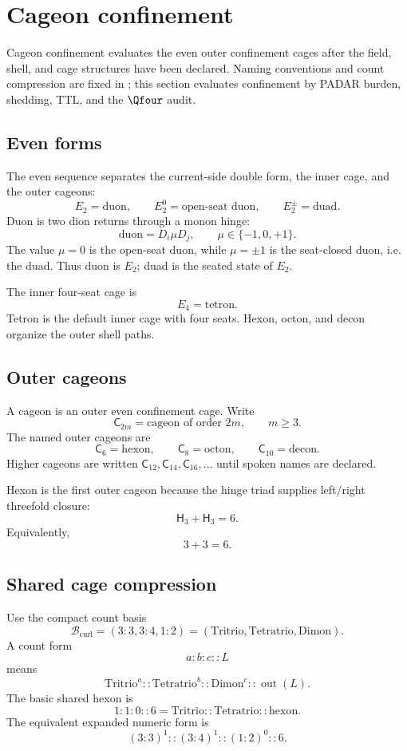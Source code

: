 \section{Cageon confinement}\label{sec:cageon-confinement}

Cageon confinement evaluates the even outer confinement cages after the field, shell, and cage structures have been declared. Naming conventions and count compression are fixed in ; this section evaluates confinement by PADAR burden, shedding, TTL, and the \(\Qfour\) audit.

\subsection{Even forms}\label{subsec:cageon-even-forms}
The even sequence separates the current-side double form, the inner cage, and the outer cageons:
\[
E_2=\mathrm{duon},
\qquad
E_2^{0}=\text{open-seat duon},
\qquad
E_2^{\pm}=\mathrm{duad}.
\]
Duon is two dion returns through a monon hinge:
\[
\mathrm{duon}=D_i\mu D_j,
\qquad
\mu\in\{-1,0,+1\}.
\]
The value \(\mu=0\) is the open-seat duon, while \(\mu=\pm1\) is the seat-closed duon, i.e. the duad. Thus duon is \(E_2\); duad is the seated state of \(E_2\).

The inner four-seat cage is
\[
E_4=\mathrm{tetron}.
\]
Tetron is the default inner cage with four seats. Hexon, octon, and decon organize the outer shell paths.

\subsection{Outer cageons}\label{subsec:outer-cageons}
A cageon is an outer even confinement cage. Write
\[
\mathsf C_{2m}=\text{cageon of order }2m,
\qquad m\ge3.
\]
The named outer cageons are
\[
\mathsf C_6=\mathrm{hexon},
\qquad
\mathsf C_8=\mathrm{octon},
\qquad
\mathsf C_{10}=\mathrm{decon}.
\]
Higher cageons are written \(\mathsf C_{12},\mathsf C_{14},\mathsf C_{16},\ldots\) until spoken names are declared.

Hexon is the first outer cageon because the hinge triad supplies left/right threefold closure:
\[
\mathsf H_3+\mathsf H_3=6.
\]
Equivalently,
\[
3+3=6.
\]

\subsection{Shared cage compression}\label{subsec:shared-cage-compression}
Use the compact count basis
\[
\mathcal B_{\mathrm{curl}}=(3:3,
3:4,
1:2)=(\mathrm{Tritrio},\mathrm{Tetratrio},\mathrm{Dimon}).
\]
A count form
\[
a:b:c::L
\]
means
\[
\mathrm{Tritrio}^{a}::\mathrm{Tetratrio}^{b}::\mathrm{Dimon}^{c}::\operatorname{out}(L).
\]
The basic shared hexon is
\[
1:1:0::6
=
\mathrm{Tritrio}::\mathrm{Tetratrio}::\mathrm{hexon}.
\]
The equivalent expanded numeric form is
\[
(3:3)^1::(3:4)^1::(1:2)^0::6.
\]

